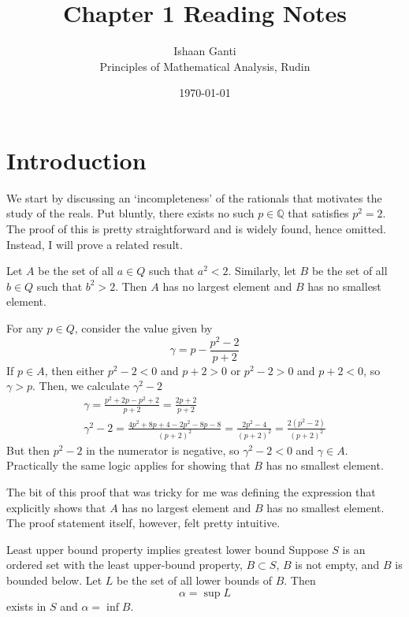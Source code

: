 \documentclass[a4paper,10pt]{article}
\theoremstyle{plain}
\begin{document}
\title{Chapter 1 Reading Notes}
\author{Ishaan Ganti \\ Principles of Mathematical Analysis, Rudin}
\date{\today}
\maketitle
\section{Introduction}
We start by discussing an `incompleteness' of the rationals that 
motivates the study of the reals. Put bluntly, there exists no
such $p \in \mathbb{Q}$ that satisfies $p^2 = 2$. The proof of this 
is pretty straightforward and is widely found, hence omitted. Instead,
I will prove a related result. 

\begin{mytheorem}{}{}
    Let $A$ be the set of all $a \in Q$ such that $a^2 < 2$. Similarly, let $B$ 
    be the set of all $b \in Q$ such that $b^2 > 2$. Then $A$ has no largest
    element and $B$ has no smallest element. 
\end{mytheorem}

\begin{myproof}
    For any $p \in Q$, consider the value given by 
    \[
        \gamma = p - \frac{p^2 - 2}{p + 2}
    \]
    If $p \in A$, then either $p^2 - 2 < 0$ and $p + 2 > 0$ or $p^2 - 2 > 0$ and $p + 2 < 0$, so
    $\gamma > p$. Then, we calculate $\gamma^2-2$
    \begin{gather*}
        \gamma = \frac{p^2 + 2p - p^2+2}{p+2} = \frac{2p + 2}{p + 2} \\
        \gamma^2 - 2 = 
        \frac{4p^2 + 8p + 4 - 2p^2 - 8p - 8}{(p+2)^2} = \frac{2p^2 - 4}{(p+2)^2} = \frac{2(p^2 - 2)}{(p+2)^2}  
    \end{gather*}
    But then $p^2 - 2$ in the numerator is negative, so $\gamma^2 -2 <0$ and $\gamma \in A$. Practically
    the same logic applies for showing that $B$ has no smallest element. 
\end{myproof}

The bit of this proof that was tricky for me was defining the expression that 
explicitly shows that $A$ has no largest element and $B$ has no smallest element. The proof
statement itself, however, felt pretty intuitive. 

\begin{mytheorem}{Least upper bound property implies greatest lower bound}{}
    Suppose \(S\) is an ordered set with the least upper-bound property, 
    \(B \subset S\), \(B\) is not empty, and \(B\) is bounded below. Let \(L\) 
    be the set of all lower bounds of \(B\). Then 
    \[
        \alpha = \sup L
    \]
    exists in \(S\) and \(\alpha = \inf B\). 
\end{mytheorem}
\end{document}

